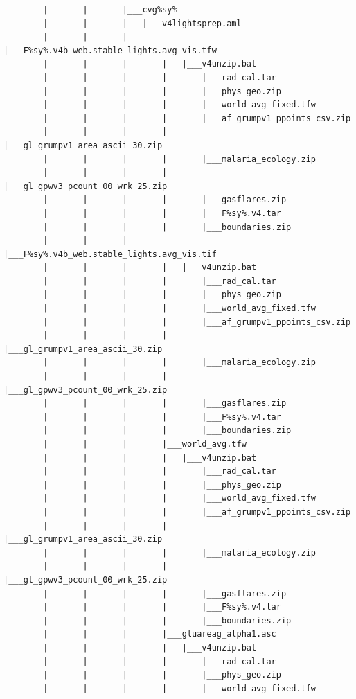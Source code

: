 \documentclass[]{book}
\begin{document}
\begin{verbatim}
        |       |       |___cvg%sy%
        |       |       |   |___v4lightsprep.aml
        |       |       |       |___F%sy%.v4b_web.stable_lights.avg_vis.tfw
        |       |       |       |   |___v4unzip.bat
        |       |       |       |       |___rad_cal.tar
        |       |       |       |       |___phys_geo.zip
        |       |       |       |       |___world_avg_fixed.tfw
        |       |       |       |       |___af_grumpv1_ppoints_csv.zip
        |       |       |       |       |___gl_grumpv1_area_ascii_30.zip
        |       |       |       |       |___malaria_ecology.zip
        |       |       |       |       |___gl_gpwv3_pcount_00_wrk_25.zip
        |       |       |       |       |___gasflares.zip
        |       |       |       |       |___F%sy%.v4.tar
        |       |       |       |       |___boundaries.zip
        |       |       |       |___F%sy%.v4b_web.stable_lights.avg_vis.tif
        |       |       |       |   |___v4unzip.bat
        |       |       |       |       |___rad_cal.tar
        |       |       |       |       |___phys_geo.zip
        |       |       |       |       |___world_avg_fixed.tfw
        |       |       |       |       |___af_grumpv1_ppoints_csv.zip
        |       |       |       |       |___gl_grumpv1_area_ascii_30.zip
        |       |       |       |       |___malaria_ecology.zip
        |       |       |       |       |___gl_gpwv3_pcount_00_wrk_25.zip
        |       |       |       |       |___gasflares.zip
        |       |       |       |       |___F%sy%.v4.tar
        |       |       |       |       |___boundaries.zip
        |       |       |       |___world_avg.tfw
        |       |       |       |   |___v4unzip.bat
        |       |       |       |       |___rad_cal.tar
        |       |       |       |       |___phys_geo.zip
        |       |       |       |       |___world_avg_fixed.tfw
        |       |       |       |       |___af_grumpv1_ppoints_csv.zip
        |       |       |       |       |___gl_grumpv1_area_ascii_30.zip
        |       |       |       |       |___malaria_ecology.zip
        |       |       |       |       |___gl_gpwv3_pcount_00_wrk_25.zip
        |       |       |       |       |___gasflares.zip
        |       |       |       |       |___F%sy%.v4.tar
        |       |       |       |       |___boundaries.zip
        |       |       |       |___gluareag_alpha1.asc
        |       |       |       |   |___v4unzip.bat
        |       |       |       |       |___rad_cal.tar
        |       |       |       |       |___phys_geo.zip
        |       |       |       |       |___world_avg_fixed.tfw

\end{verbatim}
\end{document}
